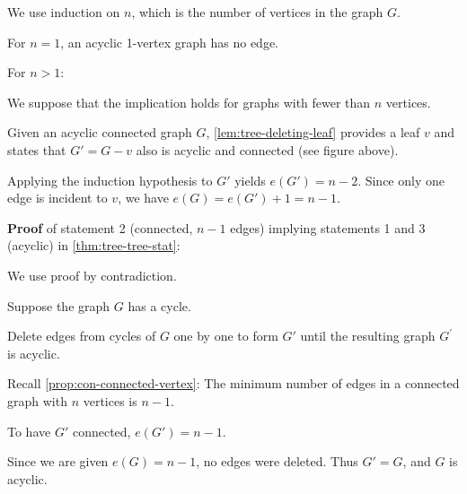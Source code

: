 \documentclass[../src/handouts/main.tex]{subfiles}
\begin{document}
\begin{enumerate*}
  \vspace{-.25em} %
  \item We use induction on $n$, which is the number of vertices in the graph $G$.
  \item For $n = 1$, an acyclic 1-vertex graph has no edge.
  \item For $n > 1$:
    \vspace{.5em}
    \begin{enumerate*}
      \item We suppose that the implication holds for graphs with fewer than $n$ vertices.
      \item Given an acyclic connected graph $G$, \cref{lem:tree-deleting-leaf} provides a leaf $v$ and states that $G' = G - v$ also is acyclic and connected (see figure above).
      \item Applying the induction hypothesis to $G'$ yields $e \left( G' \right) = n - 2$. Since only one edge is incident to $v$, we have $e(G) = e \left( G' \right) + 1 = n - 1$.
    \end{enumerate*}
    \vspace{.25em} %
\end{enumerate*}
\vspace{.5em} %

\textbf{Proof} of statement 2 (connected, $n - 1$ edges) implying statements 1 and 3 (acyclic) in \cref{thm:tree-tree-stat}:
\begin{enumerate*}
  \item We use proof by contradiction.
  \item Suppose the graph $G$ has a cycle.
  \item Delete edges from cycles of $G$ one by one to form $G'$ until the resulting graph $G^{\prime}$ is acyclic. 
  \item Recall \cref{prop:con-connected-vertex}: The minimum number of edges in a connected graph with $n$ vertices is $n - 1$.
  \item To have $G'$ connected, $e\left( G' \right) = n - 1$.
  \item Since we are given $e(G) = n - 1$, no edges were deleted. Thus $G' = G$, and $G$ is acyclic.
\end{enumerate*}
\vspace{.5em} %
\end{document}
